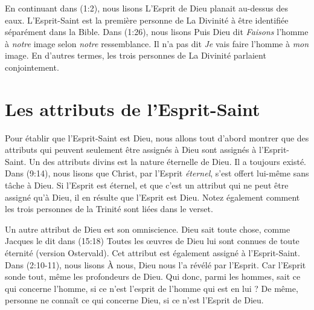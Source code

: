 En continuant dans (1:2), nous lisons\frcolon{}
 \Og L'Esprit de Dieu planait au-dessus des eaux. \Fg{}
 L'Esprit-Saint est la première personne de La Divinité à être identifiée
 séparément dans la Bible.
 Dans (1:26), nous lisons\frcolon{}
 \Og Puis Dieu dit\frcolon{} \emph{Faisons} l'homme à \emph{notre} image
 selon \emph{notre} ressemblance. \Fg{}
 Il n'a pas dit\frcolon{} \Og \emph{Je} vais faire l'homme à \emph{mon} image. \Fg{}
 En d'autres termes, les trois personnes de La Divinité parlaient conjointement.

\section{Les attributs de l'Esprit-Saint}

Pour établir que l'Esprit-Saint est Dieu, nous allons tout d'abord montrer
 que des attributs qui peuvent seulement être assignés à Dieu sont assignés à
 l'Esprit-Saint.
 Un des attributs divins est la nature éternelle de Dieu.
 Il a toujours existé. Dans (9:14), nous lisons que \Og Christ,
 par l'Esprit \emph{éternel}, s'est offert lui-même sans tâche à Dieu. \Fg{}
 Si l'Esprit est éternel, et que c'est un attribut qui ne peut être assigné
 qu'à Dieu, il en résulte que l'Esprit est Dieu.
 Notez également comment les trois personnes de la Trinité sont liées
 dans le verset.

Un autre attribut de Dieu est son omniscience. Dieu sait toute chose, comme
 Jacques le dit dans (15:18)\frcolon{}
 \Og Toutes les œuvres de Dieu lui sont connues de toute éternité \Fg{} (version Ostervald).
 Cet attribut est également assigné à
 l'Esprit-Saint. Dans (2:10-11), nous lisons\frcolon{} \Og À nous, Dieu
 nous l'a révélé par l'Esprit. Car l'Esprit sonde tout, même les profondeurs de
 Dieu. Qui donc, parmi les hommes, sait ce qui concerne l'homme, si ce n'est
 l'esprit de l'homme qui est en lui ? De même, personne ne connaît ce qui
 concerne Dieu, si ce n'est l'Esprit de Dieu. \Fg{}

